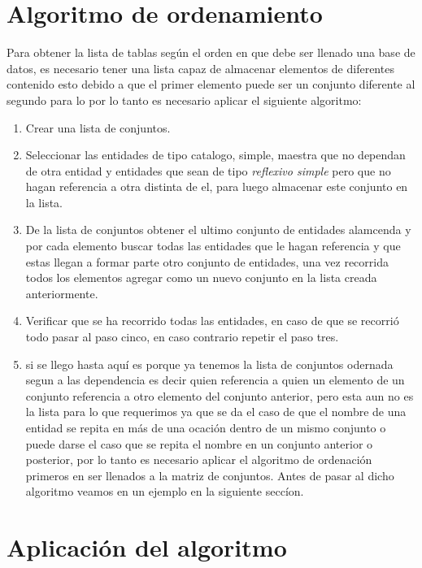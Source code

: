 \section{Algoritmo de ordenamiento}
\label{Algoritmo de ordenamiento}
Para obtener la lista de tablas seg\'un el orden en que debe ser llenado una base de datos,  es necesario tener una lista capaz de almacenar elementos de diferentes contenido esto debido a que el primer elemento puede ser un conjunto diferente al segundo para lo por lo tanto es necesario aplicar el siguiente algoritmo:
\begin{enumerate}
\item Crear una lista de conjuntos.
\item Seleccionar las entidades de tipo catalogo, simple, maestra que no dependan de otra entidad y entidades que sean de tipo \textit{reflexivo simple} pero que no hagan referencia a otra distinta de el, para luego almacenar este conjunto en la lista.
\item De la lista de conjuntos obtener el ultimo conjunto de entidades alamcenda y por cada elemento buscar todas las entidades que le hagan referencia y que estas llegan a formar parte otro conjunto de entidades, una vez recorrida todos los elementos agregar como un nuevo conjunto en la lista creada anteriormente.
\item Verificar que se ha recorrido todas las entidades, en caso de que se recorri\'o todo pasar al paso cinco, en caso contrario repetir el paso tres.
\item si se llego hasta aqu\'i es porque ya tenemos la lista de conjuntos odernada segun a las dependencia es decir quien referencia a quien un elemento de un conjunto referencia a otro elemento del conjunto anterior, pero esta aun no es la lista para lo que requerimos ya que se da el caso de que el nombre de una entidad se repita en m\'as de una ocaci\'on dentro de un mismo conjunto o puede darse el caso que se repita el nombre en un conjunto anterior o posterior, por lo tanto es necesario aplicar el algoritmo de ordenaci\'on primeros en ser llenados a la matriz de conjuntos. Antes de pasar al dicho algoritmo veamos en un ejemplo en la siguiente secc\'ion.
\end{enumerate}
\section{Aplicaci\'on del algoritmo}

